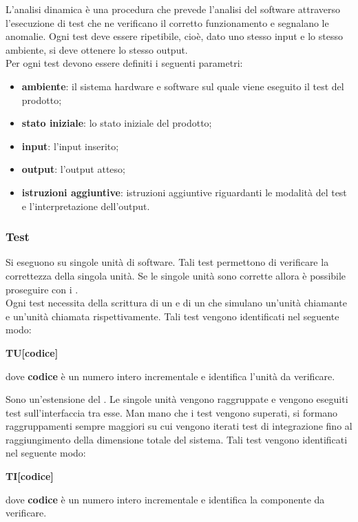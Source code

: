                 L'analisi dinamica è una procedura che prevede l'analisi del software attraverso l'esecuzione di test che ne verificano il corretto funzionamento e segnalano le anomalie. Ogni test deve essere ripetibile, cioè, dato uno stesso input e lo stesso ambiente, si deve ottenere lo stesso output.\\
                Per ogni test devono essere definiti i seguenti parametri:
                    \begin{itemize}
                        \item\textbf{ambiente}: il sistema hardware e software sul quale viene eseguito il test del prodotto;
                        \item\textbf{stato iniziale}: lo stato iniziale del prodotto;
                        \item\textbf{input}: l'input inserito;
                        \item\textbf{output}: l'output atteso; 
                        \item\textbf{istruzioni aggiuntive}: istruzioni aggiuntive riguardanti le modalità del test e l'interpretazione dell'output.
                    \end{itemize}        
        
        \subsubsection{Test}
            Si eseguono su singole unità di software. Tali test permettono di verificare la correttezza della singola unità. 
            Se le singole unità sono corrette allora è possibile proseguire con i . \\
            Ogni test necessita della scrittura di un  e di un  che simulano un'unità chiamante e un'unità chiamata rispettivamente.
            Tali test vengono identificati nel seguente modo:
                \begin{center}\textbf{TU[codice]}\end{center}
            dove \textbf{codice} è un numero intero incrementale e identifica l'unità da verificare.
            
            Sono un'estensione del . Le singole unità vengono raggruppate e vengono eseguiti test sull'interfaccia tra esse. 
            Man mano che i test vengono superati, si formano raggruppamenti sempre maggiori su cui vengono iterati test di integrazione fino al raggiungimento della dimensione totale del sistema.
            Tali test vengono identificati nel seguente modo:
                \begin{center}\textbf{TI[codice]}\end{center}
            dove \textbf{codice} è un numero intero incrementale e identifica la componente da verificare.
            
